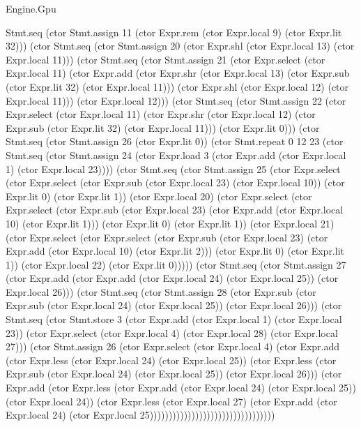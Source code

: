 \begin{lexlean}{Engine.Gpu}
\begin{semanticmodule}
{Stmt.seq (ctor Stmt.assign 11 (ctor Expr.rem (ctor Expr.local 9) (ctor Expr.lit 32))) (ctor Stmt.seq (ctor Stmt.assign 20 (ctor Expr.shl (ctor Expr.local 13) (ctor Expr.local 11))) (ctor Stmt.seq (ctor Stmt.assign 21 (ctor Expr.select (ctor Expr.local 11) (ctor Expr.add (ctor Expr.shr (ctor Expr.local 13) (ctor Expr.sub (ctor Expr.lit 32) (ctor Expr.local 11))) (ctor Expr.shl (ctor Expr.local 12) (ctor Expr.local 11))) (ctor Expr.local 12))) (ctor Stmt.seq (ctor Stmt.assign 22 (ctor Expr.select (ctor Expr.local 11) (ctor Expr.shr (ctor Expr.local 12) (ctor Expr.sub (ctor Expr.lit 32) (ctor Expr.local 11))) (ctor Expr.lit 0))) (ctor Stmt.seq (ctor Stmt.assign 26 (ctor Expr.lit 0)) (ctor Stmt.repeat 0 12 23 (ctor Stmt.seq (ctor Stmt.assign 24 (ctor Expr.load 3 (ctor Expr.add (ctor Expr.local 1) (ctor Expr.local 23)))) (ctor Stmt.seq (ctor Stmt.assign 25 (ctor Expr.select (ctor Expr.select (ctor Expr.sub (ctor Expr.local 23) (ctor Expr.local 10)) (ctor Expr.lit 0) (ctor Expr.lit 1)) (ctor Expr.local 20) (ctor Expr.select (ctor Expr.select (ctor Expr.sub (ctor Expr.local 23) (ctor Expr.add (ctor Expr.local 10) (ctor Expr.lit 1))) (ctor Expr.lit 0) (ctor Expr.lit 1)) (ctor Expr.local 21) (ctor Expr.select (ctor Expr.select (ctor Expr.sub (ctor Expr.local 23) (ctor Expr.add (ctor Expr.local 10) (ctor Expr.lit 2))) (ctor Expr.lit 0) (ctor Expr.lit 1)) (ctor Expr.local 22) (ctor Expr.lit 0))))) (ctor Stmt.seq (ctor Stmt.assign 27 (ctor Expr.add (ctor Expr.add (ctor Expr.local 24) (ctor Expr.local 25)) (ctor Expr.local 26))) (ctor Stmt.seq (ctor Stmt.assign 28 (ctor Expr.sub (ctor Expr.sub (ctor Expr.local 24) (ctor Expr.local 25)) (ctor Expr.local 26))) (ctor Stmt.seq (ctor Stmt.store 3 (ctor Expr.add (ctor Expr.local 1) (ctor Expr.local 23)) (ctor Expr.select (ctor Expr.local 4) (ctor Expr.local 28) (ctor Expr.local 27))) (ctor Stmt.assign 26 (ctor Expr.select (ctor Expr.local 4) (ctor Expr.add (ctor Expr.less (ctor Expr.local 24) (ctor Expr.local 25)) (ctor Expr.less (ctor Expr.sub (ctor Expr.local 24) (ctor Expr.local 25)) (ctor Expr.local 26))) (ctor Expr.add (ctor Expr.less (ctor Expr.add (ctor Expr.local 24) (ctor Expr.local 25)) (ctor Expr.local 24)) (ctor Expr.less (ctor Expr.local 27) (ctor Expr.add (ctor Expr.local 24) (ctor Expr.local 25)))))))))))))))))))))))))))))))))
}


\end{semanticmodule}
\end{lexlean}
